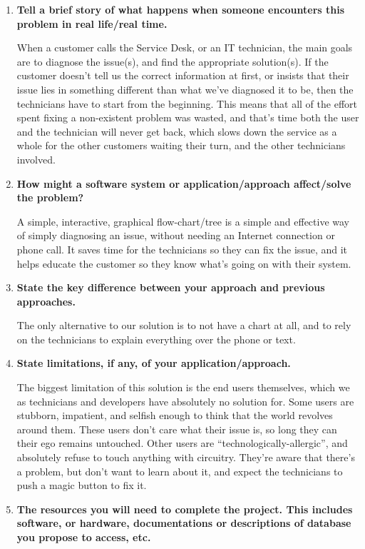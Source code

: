 \documentclass[12pt, letterpaper]{article}
\begin{document}
\begin{enumerate}
	
	\item \textbf{Tell a brief story of what happens when someone encounters this problem in real life/real time.}
	
	When a customer calls the Service Desk, or an IT technician, the main goals are to diagnose the issue(s), and find the appropriate solution(s). If the customer doesn’t tell us the correct information at first, or insists that their issue lies in something different than what we’ve diagnosed it to be, then the technicians have to start from the beginning. This means that all of the effort spent fixing a non-existent problem was wasted, and that’s time both the user and the technician will never get back, which slows down the service as a whole for the other customers waiting their turn, and the other technicians involved.
	
	\item \textbf{How might a software system or application/approach affect/solve the problem?}
	
	A simple, interactive, graphical flow-chart/tree is a simple and effective way of simply diagnosing an issue, without needing an Internet connection or phone call. It saves time for the technicians so they can fix the issue, and it helps educate the customer so they know what’s going on with their system. 
	
	\item \textbf{State the key difference between your approach and previous approaches.}

	The only alternative to our solution is to not have a chart at all, and to rely on the technicians to explain everything over the phone or text. 

	\item \textbf{State limitations, if any, of your application/approach.}
	
	The biggest limitation of this solution is the end users themselves, which we as technicians and developers have absolutely no solution for. Some users are stubborn, impatient, and selfish enough to think that the world revolves around them. These users don’t care what their issue is, so long they can their ego remains untouched. Other users are “technologically-allergic”, and absolutely refuse to touch anything with circuitry. They’re aware that there’s a problem, but don’t want to learn about it, and expect the technicians to push a magic button to fix it.
	
	\item \textbf{The resources you will need to complete the project. This includes software, or hardware, documentations or descriptions of database you propose to access, etc.}
	

\end{enumerate}
\end{document}
